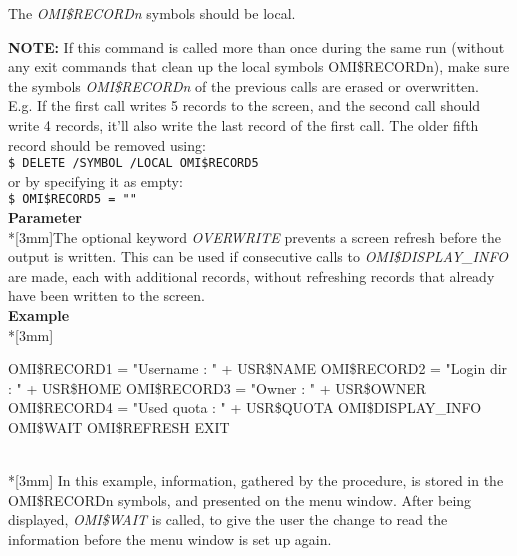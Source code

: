 \documentclass[a4paper]{book}
\newcommand{\vs}{\vspace{3mm}}
\renewcommand{\indent}{\hspace*{5mm}}
\begin{document}
The \textsl{OMI{\$}RECORD\textit{n}} symbols should be local.

\vs

\hspace{-8mm}\textbf{NOTE:}\label{note:dispinfo} If this command is called more than once during the same run 
(without any \textsf{exit} commands that clean up the local symbols 
OMI{\$}RECORDn), make sure the symbols \textsl{OMI{\$}RECORD\textit{n}} of the previous calls 
are erased or overwritten. \\
E.g. If the first call writes 5 records to the screen, and the second call 
should write 4 records, it'll also write the last record of the first call. 
The older fifth record should be removed using:\\
\indent\texttt{{\$} DELETE /SYMBOL /LOCAL OMI{\$}RECORD5} \\
or by specifying it as empty: \\
\indent\texttt{{\$} OMI{\$}RECORD5 = ""}\\[3mm]
\textbf{Parameter}\\*[3mm]The optional keyword \textsl{OVERWRITE} prevents a screen refresh before the output is written. This can be used if consecutive calls to \textsl{OMI{\$}DISPLAY{\_}INFO} are made, each  with additional records, without refreshing records that already have been written to the screen.\\[3mm]
\textbf{Example}\\*[3mm]
\begin{texttt}
\indent{\$} OMI{\$}RECORD1 = "Username : " + USR{\$}NAME \newline
\indent{\$} OMI{\$}RECORD2 = "Login dir : " + USR{\$}HOME \newline
\indent{\$} OMI{\$}RECORD3 = "Owner : " + USR{\$}OWNER \newline
\indent{\$} OMI{\$}RECORD4 = "Used quota : " + USR{\$}QUOTA \newline
\indent{\$} OMI{\$}DISPLAY{\_}INFO \newline
\indent{\$} OMI{\$}WAIT \newline
\indent{\$} OMI{\$}REFRESH \newline
\indent{\$} EXIT
\end{texttt}\\*[3mm]
In this example, information, gathered by the procedure, is stored in the 
\linebreak OMI{\$}RECORDn symbols, and presented on the menu window. After being 
displayed, \textsl{OMI{\$}WAIT} is called, 
to give the user the change to read the information before the menu window 
is set up again.
\end{document}
